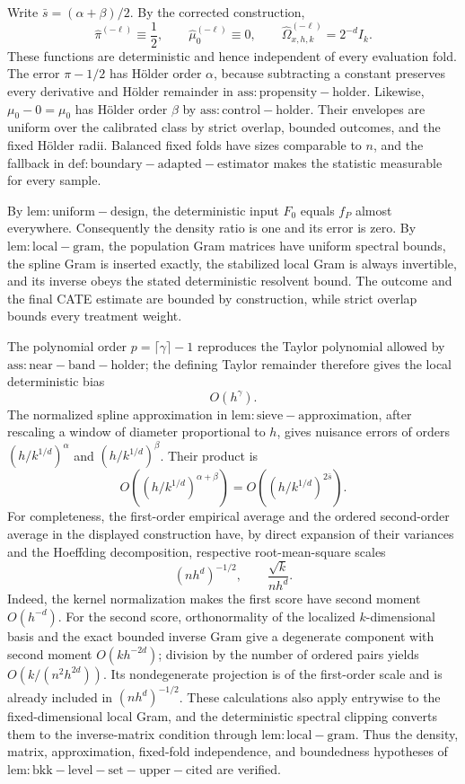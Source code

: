 Write \(\bar s=(\alpha+\beta)/2\). By the corrected construction,
\[
 \widehat\pi^{(-\ell)}\equiv\frac12,
 \qquad
 \widehat\mu_0^{(-\ell)}\equiv0,
 \qquad
 \widehat\Omega^{(-\ell)}_{x,h,k}=2^{-d}I_k.
\]
These functions are deterministic and hence independent of every evaluation fold. The error \(\pi-1/2\) has Hölder order \(\alpha\), because subtracting a constant preserves every derivative and Hölder remainder in \(\mathrm{ass:propensity-holder}\). Likewise, \(\mu_0-0=\mu_0\) has Hölder order \(\beta\) by \(\mathrm{ass:control-holder}\). Their envelopes are uniform over the calibrated class by strict overlap, bounded outcomes, and the fixed Hölder radii. Balanced fixed folds have sizes comparable to \(n\), and the fallback in \(\mathrm{def:boundary-adapted-estimator}\) makes the statistic measurable for every sample.

By \(\mathrm{lem:uniform-design}\), the deterministic input \(F_0\) equals \(f_P\) almost everywhere. Consequently the density ratio is one and its error is zero. By \(\mathrm{lem:local-gram}\), the population Gram matrices have uniform spectral bounds, the spline Gram is inserted exactly, the stabilized local Gram is always invertible, and its inverse obeys the stated deterministic resolvent bound. The outcome and the final CATE estimate are bounded by construction, while strict overlap bounds every treatment weight.

The polynomial order \(p=\lceil\gamma\rceil-1\) reproduces the Taylor polynomial allowed by \(\mathrm{ass:near-band-holder}\); the defining Taylor remainder therefore gives the local deterministic bias
\[
 O(h^\gamma).
\]
The normalized spline approximation in \(\mathrm{lem:sieve-approximation}\), after rescaling a window of diameter proportional to \(h\), gives nuisance errors of orders \((h/k^{1/d})^\alpha\) and \((h/k^{1/d})^\beta\). Their product is
\[
 O\!\left((h/k^{1/d})^{\alpha+\beta}\right)
 =O\!\left((h/k^{1/d})^{2\bar s}\right).
\]
For completeness, the first-order empirical average and the ordered second-order average in the displayed construction have, by direct expansion of their variances and the Hoeffding decomposition, respective root-mean-square scales
\[
 (nh^d)^{-1/2},
 \qquad
 \frac{\sqrt{k}}{nh^d}.
\]
Indeed, the kernel normalization makes the first score have second moment \(O(h^{-d})\). For the second score, orthonormality of the localized \(k\)-dimensional basis and the exact bounded inverse Gram give a degenerate component with second moment \(O(kh^{-2d})\); division by the number of ordered pairs yields \(O(k/(n^2h^{2d}))\). Its nondegenerate projection is of the first-order scale and is already included in \((nh^d)^{-1/2}\). These calculations also apply entrywise to the fixed-dimensional local Gram, and the deterministic spectral clipping converts them to the inverse-matrix condition through \(\mathrm{lem:local-gram}\). Thus the density, matrix, approximation, fixed-fold independence, and boundedness hypotheses of \(\mathrm{lem:bkk-level-set-upper-cited}\) are verified.

